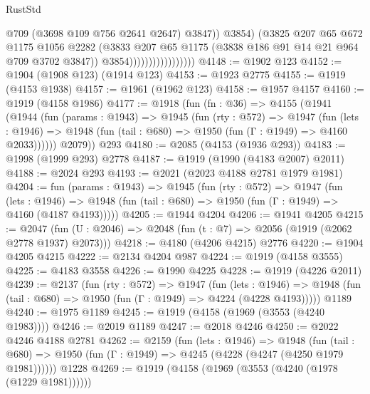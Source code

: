 \begin{lexlean}{RustStd}
\begin{coremodule}
                                          @709
                                          (@3698 @109 @756 @2641 @2647)
                                          @3847))
                                      @3854)
                                    (@3825
                                      @207
                                      @65
                                      @672
                                      @1175
                                      @1056
                                      @2282
                                      (@3833
                                        @207
                                        @65
                                        @1175
                                        (@3838 @186 @91 @14 @21 @964 @709 @3702 @3847))
                                      @3854)))))))))))))))))
@4148 := @1902 @123
@4152 := @1904 (@1908 @123) (@1914 @123)
@4153 := @1923 @2775
@4155 := @1919 (@4153 @1938)
@4157 := @1961 (@1962 @123)
@4158 := @1957 @4157
@4160 := @1919 (@4158 @1986)
@4177 := @1918
    (fun (fn : @36) =>
    @4155
      (@1941
        (@1944
          (fun (params : @1943) =>
          @1945
            (fun (rty : @572) =>
            @1947
              (fun (lets : @1946) =>
              @1948 (fun (tail : @680) => @1950 (fun (Γ : @1949) => @4160 @2033))))))
        @2079))
    @293
@4180 := @2085 (@4153 (@1936 @293))
@4183 := @1998 (@1999 @293) @2778
@4187 := @1919 (@1990 (@4183 @2007) @2011)
@4188 := @2024 @293
@4193 := @2021 (@2023 @4188 @2781 @1979 @1981)
@4204 := fun (params : @1943) =>
  @1945
    (fun (rty : @572) =>
    @1947
      (fun (lets : @1946) =>
      @1948 (fun (tail : @680) => @1950 (fun (Γ : @1949) => @4160 (@4187 @4193)))))
@4205 := @1944 @4204
@4206 := @1941 @4205
@4215 := @2047 (fun (U : @2046) => @2048 (fun (t : @7) => @2056 (@1919 (@2062 @2778 @1937) @2073)))
@4218 := @4180 (@4206 @4215) @2776
@4220 := @1904 @4205 @4215
@4222 := @2134 @4204 @987
@4224 := @1919 (@4158 @3555)
@4225 := @4183 @3558
@4226 := @1990 @4225
@4228 := @1919 (@4226 @2011)
@4239 := @2137
    (fun (rty : @572) =>
    @1947
      (fun (lets : @1946) =>
      @1948 (fun (tail : @680) => @1950 (fun (Γ : @1949) => @4224 (@4228 @4193)))))
    @1189
@4240 := @1975 @1189
@4245 := @1919 (@4158 (@1969 (@3553 (@4240 @1983))))
@4246 := @2019 @1189
@4247 := @2018 @4246
@4250 := @2022 @4246 @4188 @2781
@4262 := @2159
    (fun (lets : @1946) =>
    @1948
      (fun (tail : @680) => @1950 (fun (Γ : @1949) => @4245 (@4228 (@4247 (@4250 @1979 @1981))))))
    @1228
@4269 := @1919 (@4158 (@1969 (@3553 (@4240 (@1978 (@1229 @1981))))))

\end{coremodule}
\end{lexlean}
